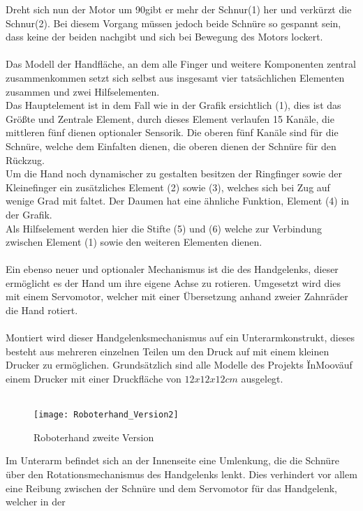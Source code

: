 \documentclass[titlepage,12pt,twoside]{article}
\begin{document}
Dreht sich nun der Motor um 90\textdegree gibt er mehr der Schnur(1) her und verkürzt die Schnur(2). Bei diesem Vorgang müssen jedoch beide Schnüre so gespannt sein, dass keine der beiden nachgibt und sich bei Bewegung des Motors lockert. \\
\\
Das Modell der Handfläche, an dem alle Finger und weitere Komponenten zentral zusammenkommen setzt sich selbst aus insgesamt vier tatsächlichen Elementen zusammen und zwei Hilfselementen. \\
Das Hauptelement ist in dem Fall wie in der Grafik ersichtlich (1), dies ist das Größte und Zentrale Element, durch dieses Element verlaufen 15 Kanäle, die mittleren fünf dienen optionaler Sensorik. Die oberen fünf Kanäle sind für die Schnüre, 
welche dem Einfalten dienen, die oberen dienen der Schnüre für den Rückzug. \\
Um die Hand noch dynamischer zu gestalten besitzen der Ringfinger sowie der Kleinefinger ein zusätzliches Element (2) sowie (3), welches sich bei Zug auf wenige Grad mit faltet. Der Daumen hat eine ähnliche Funktion, Element (4) in der Grafik. \\
Als Hilfselement werden hier die Stifte (5) und (6) welche zur Verbindung zwischen Element (1) sowie den weiteren Elementen dienen. \\
\\
Ein ebenso neuer und optionaler Mechanismus ist die des Handgelenks, dieser ermöglicht es der Hand um ihre eigene Achse zu rotieren. Umgesetzt wird dies mit einem Servomotor, welcher mit einer Übersetzung anhand zweier Zahnräder die Hand rotiert. \\
\\
Montiert wird dieser Handgelenksmechanismus auf ein Unterarmkonstrukt, dieses besteht aus mehreren einzelnen Teilen um den Druck auf mit einem kleinen Drucker zu ermöglichen. Grundsätzlich sind alle Modelle des Projekts \"InMoov\" auf einem Drucker 
mit einer Druckfläche von $12x12x12cm$ ausgelegt. \\
\\
\begin{figure}[H]
	\begin{center}
		\scalebox{1.2}
		{\texttt{[image: Roboterhand\_Version2]}}
		\caption{Roboterhand zweite Version}
		\label{fig:Roboterhand_Version2}			
	\end{center}
\end{figure}
\hfill \break
Im Unterarm befindet sich an der Innenseite eine Umlenkung, die die Schnüre über den Rotationsmechanismus des Handgelenks lenkt. Dies verhindert vor allem eine Reibung zwischen der Schnüre und dem Servomotor für das Handgelenk, welcher in der 
\end{document}
